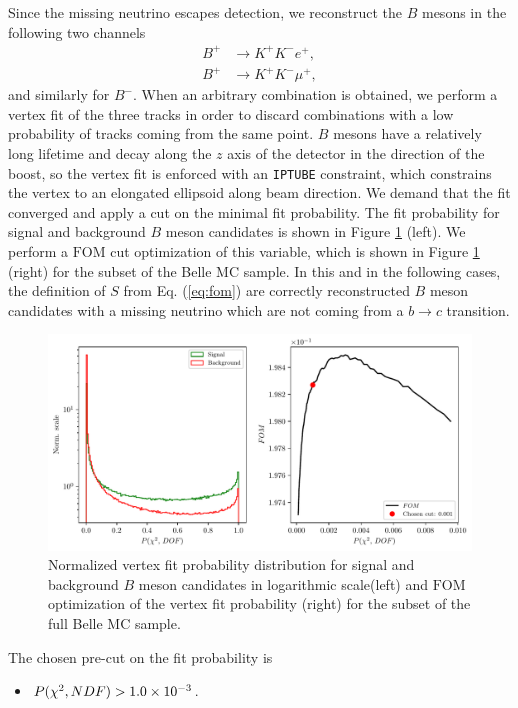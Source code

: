 Since the missing neutrino escapes detection, we reconstruct the $B$ mesons in the following two channels
\begin{align*}
B^+ &\to K^+ K^- e^+, \\
B^+ &\to K^+ K^- \mu^+,
\end{align*}
and similarly for $B^-$. When an arbitrary combination is obtained, we perform a vertex fit of the three tracks in order to discard combinations with a low probability of tracks coming from the same point. $B$ mesons have a relatively long lifetime and decay along the $z$ axis of the detector in the direction of the boost, so the vertex fit is enforced with an \texttt{IPTUBE} constraint, which constrains the vertex to an elongated ellipsoid along beam direction. We demand that the fit converged and apply a cut on the minimal fit probability. The fit probability for signal and background $B$ meson candidates is shown in Figure \ref{fig:vtx} (left). We perform a $\mathrm{FOM}$ cut optimization of this variable, which is shown in Figure \ref{fig:vtx} (right) for the subset of the Belle MC sample. In this and in the following cases, the definition of $S$ from Eq. (\ref{eq:fom}) are correctly reconstructed $B$ meson candidates with a missing neutrino which are not coming from a $b \to c$ transition.

\begin{figure}[!htb]
	\centering
	\captionsetup{width=0.8\linewidth}
	\includegraphics[width=\linewidth]{fig/VTX}
	\caption{Normalized vertex fit probability distribution for signal and background $B$ meson candidates in logarithmic scale(left) and $\mathrm{FOM}$ optimization of the vertex fit probability (right) for the subset of the full Belle MC sample.}
	\label{fig:vtx}
\end{figure}

The chosen pre-cut on the fit probability is
\begin{itemize}
	\item $P(\chi^2,NDF) > 1.0\times 10^{-3}$.
\end{itemize}

